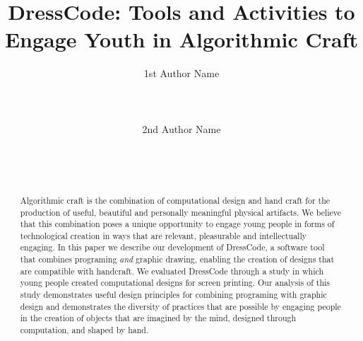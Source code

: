 \documentclass{sigchi}
\begin{document}
\title{DressCode: Tools and Activities to Engage Youth in Algorithmic Craft}

\author{
 \alignauthor 1st Author Name\\
  \\
  \\
  \\
 \alignauthor 2nd Author Name\\
  \\
  \\
  \\
}

\maketitle

\begin{abstract}
	Algorithmic craft is the combination of computational design and hand craft for the production of useful, beautiful and personally meaningful physical artifacts. We believe that this combination poses a unique opportunity to engage young people in forms of technological creation in ways that are relevant, pleasurable and intellectually engaging. In this paper we describe our development of DressCode, a software tool that combines programing \emph{and} graphic drawing, enabling the creation of designs that are compatible with handcraft. We evaluated DressCode through a study in which young people created computational designs for screen printing. Our analysis of this study demonstrates useful design principles for combining programing with graphic design and demonstrates the diversity of practices that are possible by engaging people in the creation of objects that are imagined by the mind, designed through computation, and shaped by hand.
\end{abstract}


\end{document}
